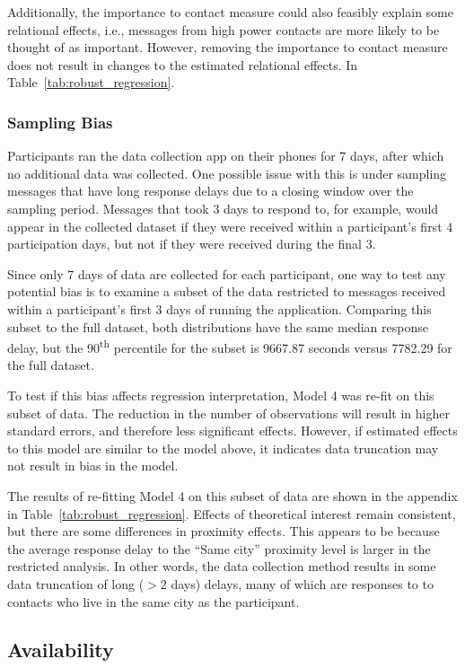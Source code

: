\documentclass[12pt]{nuthesis}	%
\begin{document}
Additionally, the importance to contact measure could also feasibly explain some relational effects, i.e., messages from high power contacts are more likely to be thought of as important. However, removing the importance to contact measure does not result in changes to the estimated relational effects. In Table~\ref{tab:robust_regression}.

\subsubsection{Sampling Bias}

Participants ran the data collection app on their phones for 7 days, after which no additional data was collected. One possible issue with this is under sampling messages that have long response delays due to a closing window over the sampling period. Messages that took 3 days to respond to, for example, would appear in the collected dataset if they were received within a participant's first 4 participation days, but not if they were received during the final 3.

Since only 7 days of data are collected for each participant, one way to test any potential bias is to examine a subset of the data restricted to messages received within a participant's first 3 days of running the application. Comparing this subset to the full dataset, both distributions have the same median response delay, but the 90\textsuperscript{th} percentile for the subset is 9667.87 seconds versus 7782.29 for the full dataset.

To test if this bias affects regression interpretation, Model 4 was re-fit on this subset of data. The reduction in the number of observations will result in higher standard errors, and therefore less significant effects. However, if estimated effects to this model are similar to the model above, it indicates data truncation may not result in bias in the model.

The results of re-fitting Model 4 on this subset of data are shown in the appendix in Table~\ref{tab:robust_regression}. Effects of theoretical interest remain consistent, but there are some differences in proximity effects. This appears to be because the average response delay to the ``Same city'' proximity level is larger in the restricted analysis. In other words, the data collection method results in some data truncation of long ($> 2$ days) delays, many of which are responses to to contacts who live in the same city as the participant.


\subsection{Availability}
\end{document}
